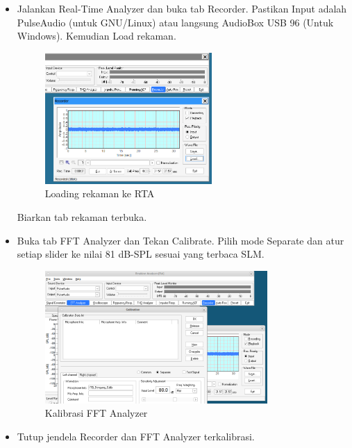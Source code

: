 \documentclass{article}
\begin{document}
	\begin{itemize}
		\item Jalankan Real-Time Analyzer dan buka tab Recorder.
		Pastikan Input adalah PulseAudio (untuk GNU/Linux) atau langsung AudioBox USB 96 (Untuk Windows).
		Kemudian Load rekaman.

		\begin{figure}[H]
			\centering
			\includegraphics[width=0.6\textwidth,angle=0]{images/rta_load}
			\caption{Loading rekaman ke RTA}
		\end{figure}

		Biarkan tab rekaman terbuka.

		\item Buka tab FFT Analyzer dan Tekan Calibrate.
		Pilih mode Separate dan atur setiap slider ke nilai 81 dB-SPL sesuai yang terbaca SLM.

		\begin{figure}[H]
			\centering
			\includegraphics[width=0.8\textwidth,angle=0]{images/rta_calib}
			\caption{Kalibrasi FFT Analyzer}
		\end{figure}

		\newpage
		\item Tutup jendela Recorder dan FFT Analyzer terkalibrasi.


\end{itemize}
\end{document}
